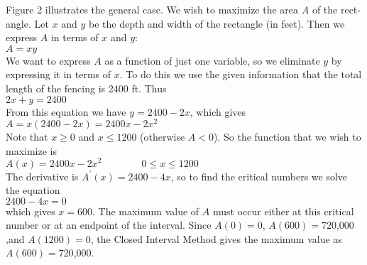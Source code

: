 \documentclass{sebase}
\begin{document}
\begin{Solution}
Figure 2 illustrates the general case. We wish to maximize the area $A$ of
the rect-\linebreak angle. 
Let $x$ and $y$ be the depth and width of the rectangle (in feet). Then we
express $A$ in terms of $x$ and $y$:\\[6pt]
\hspace*{\fill}$A=xy$\hspace*{\fill}\\[9pt]
We want to express $A$ as a function of just one variable, so we eliminate $%
y $ by expressing it in terms of $x$. To do this we use the given
information that the total length of the fencing is 2400 ft. Thus\\[6pt]
\hspace*{\fill}$2x+y=2400$\hspace*{\fill}\\[9pt]
From this equation we have $y=2400-2x$, which gives\\[6pt]
\hspace*{\fill}$A=x(2400-2x)=2400x-2x^{2}$\hspace*{\fill}\\[9pt]
Note that $x\geq 0$ and $x\leq 1200$ (otherwise $A<0$). So the function that
we wish to maximize is\\[6pt]
\hspace*{\fill}$A(x)=2400x-2x^{2}\qquad \qquad 0\leq x\leq 1200$\hspace*{%
\fill}\\[9pt]
The derivative is $A^{\prime }\left( x\right) =2400-4x$, so to find the
critical numbers we solve the equation\\[6pt]
\hspace*{\fill}$2400-4x=0$\hspace*{\fill}\\[9pt]
which gives $x=600$. The maximum value of $A$ must occur either at this
critical number or at an endpoint of the interval. Since $A(0)=0$, $%
A(600)=720$,$000$,\linebreak and $A(1200)=0$, the Closed Interval Method
gives the maximum value as \newline
$A(600)=720$,$000$.


\end{Solution}
\end{document}
